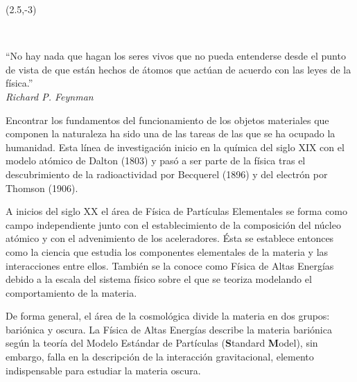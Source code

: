 \begin{textblock}{9}(2.5,-3)
\begin{flushright}
\setlength{\baselineskip}{15pt}
~

``No hay nada que hagan los seres vivos que no pueda entenderse desde el punto de vista de que están hechos de átomos que actúan de acuerdo con las leyes de la física.''\\[.5cm]
\textit{Richard P. Feynman}
\end{flushright}
\end{textblock}


Encontrar los fundamentos del funcionamiento de los objetos materiales que componen la naturaleza ha sido una de las tareas de las que se ha ocupado la humanidad. Esta línea de investigación inicio en la química del siglo XIX con el modelo atómico de Dalton (1803) y pasó a ser parte de la física tras el descubrimiento de la radioactividad por %
Becquerel (1896) y del electrón por Thomson (1906).

A inicios del siglo XX el área de Física de Partículas Elementales se forma como campo independiente junto con el establecimiento de la composición del núcleo atómico y con el advenimiento de los aceleradores. Ésta se establece entonces como la ciencia que estudia los componentes elementales de la materia y las interacciones entre ellos. También se la conoce como Física de Altas Energías debido a la escala del sistema físico sobre el que se teoriza modelando el comportamiento de la materia.

De forma general, el área de la cosmológica divide la materia en dos grupos: bariónica y oscura. La Física de Altas Energías describe la materia bariónica según la teoría del Modelo Estándar de Partículas \ME(\textbf{S}tandard \textbf{M}odel), sin embargo, falla en la descripción de la interacción gravitacional, elemento indispensable para estudiar la materia oscura.